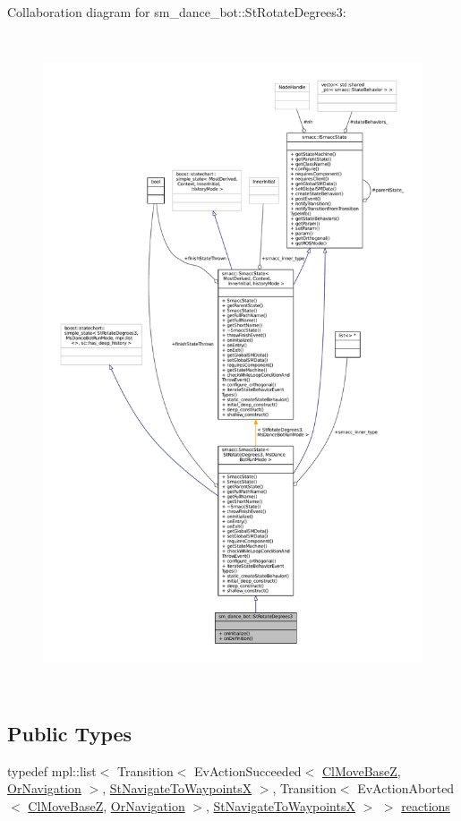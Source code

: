 Collaboration diagram for sm\+\_\+dance\+\_\+bot\+:\+:St\+Rotate\+Degrees3\+:
\nopagebreak
\begin{figure}[H]
\begin{center}
\leavevmode
\includegraphics[height=550pt]{structsm__dance__bot_1_1StRotateDegrees3__coll__graph}
\end{center}
\end{figure}
\subsection*{Public Types}
\begin{DoxyCompactItemize}
\item 
typedef mpl\+::list$<$ Transition$<$ Ev\+Action\+Succeeded$<$ \hyperlink{classmove__base__z__client_1_1ClMoveBaseZ}{Cl\+Move\+BaseZ}, \hyperlink{classsm__dance__bot_1_1OrNavigation}{Or\+Navigation} $>$, \hyperlink{structsm__dance__bot_1_1StNavigateToWaypointsX}{St\+Navigate\+To\+WaypointsX} $>$, Transition$<$ Ev\+Action\+Aborted$<$ \hyperlink{classmove__base__z__client_1_1ClMoveBaseZ}{Cl\+Move\+BaseZ}, \hyperlink{classsm__dance__bot_1_1OrNavigation}{Or\+Navigation} $>$, \hyperlink{structsm__dance__bot_1_1StNavigateToWaypointsX}{St\+Navigate\+To\+WaypointsX} $>$ $>$ \hyperlink{structsm__dance__bot_1_1StRotateDegrees3_afbfb018473d5a16b0b111b3b626aca6b}{reactions}
\end{DoxyCompactItemize}
